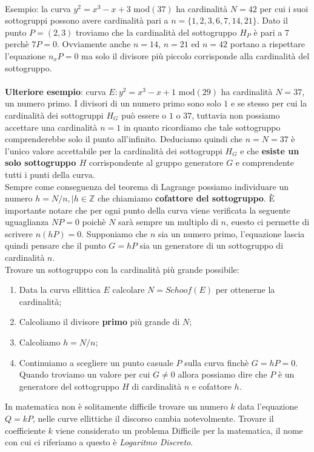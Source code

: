 \documentclass[a4paper,12pt]{tesiinfo}
\begin{document}
\\
Esempio: la curva $y^2 = x^3-x+3$ mod$(37)$ ha cardinalit\`a $N=42$ per cui i suoi sottogruppi possono avere cardinalit\`a pari a $n= \{1, 2, 3, 6, 7, 14, 21\}$. Dato il punto $P=(2, 3)$ troviamo che la cardinalit\`a del sottogruppo $H_P$ \`e pari a 7 perch\`e $7P = 0$. Ovviamente anche $n = 14$, $n = 21$ ed $n=42$ portano a rispettare l'equazione $n_xP=0$ ma solo il divisore pi\`u piccolo corrisponde alla cardinalit\`a del sottogruppo.
\\
\\
\textbf{Ulteriore esempio}: curva $E: y^2 = x^3 -x+1$ mod$(29)$ ha cardinalit\`a $N=37$, un numero primo. I divisori di un numero primo sono solo $1$ e se stesso per cui la cardinalit\`a dei sottogruppi $H_G$ pu\`o essere o $1$ o $37$, tuttavia non possiamo accettare una cardinalit\`a $n=1$ in quanto ricordiamo che tale sottogruppo comprenderebbe solo il punto all'infinito. Deduciamo quindi che $n = N = 37$ \`e l'unico valore accettabile per la cardinalit\`a dei sottogruppi $H_G$ e che \textbf{esiste un solo sottogruppo $H$} corrispondente al gruppo generatore $G$ e comprendente tutti i punti della curva.
\\
Sempre come conseguenza del teorema di Lagrange possiamo individuare un numero $h= N \big / n, \mid h \in \mathbb{Z}$ che chiamiamo \textbf{cofattore del sottogruppo}. \`E importante notare che per ogni punto della curva viene verificata la seguente uguaglianza $NP=0$ poich\`e $N$ sar\`a sempre un multiplo di $n$, euesto ci permette di scrivere $n(hP)=0$. Supponiamo che $n$ sia un numero primo, l'equazione lascia quindi pensare che il punto $G = hP$ sia un generatore di un sottogruppo di cardinalit\`a $n$.
\\
Trovare un sottogruppo con la cardinalit\`a pi\`u grande possibile:
\begin{enumerate}
    \item Data la curva ellittica $E$ calcolare $N = Schoof(E)$ per ottenerne la cardinalit\`a;
    \item Calcoliamo il divisore \textbf{primo} pi\`u grande di $N$;
    \item Calcoliamo $h = N \big / n$;
    \item Continuiamo a scegliere un punto casuale $P$ sulla curva finch\`e $G = hP = 0$. Quando troviamo un valore per cui $G \ne 0$ allora possiamo dire che $P$ \`e un generatore del sottogruppo $H$ di cardinalit\`a $n$ e cofattore $h$.
\end{enumerate}
In matematica non \`e solitamente difficile trovare un numero $k$ data l'equazione $Q = kP$, nelle curve ellittiche il discorso cambia notevolmente. Trovare il coefficiente $k$ viene considerato un problema Difficile per la matematica, il nome con cui ci riferiamo a questo \`e \textit{Logaritmo Discreto}.
\end{document}

